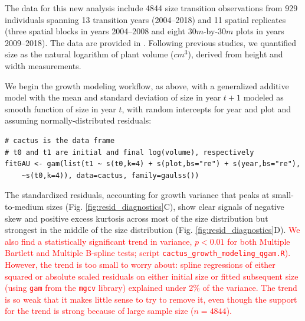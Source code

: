 \documentclass[12pt]{article}
\newcommand{\new}{\textcolor{red}}
\begin{document}
The data for this new analysis include 4844 size transition observations from 929 individuals spanning 13 transition years (2004--2018) and 11 spatial replicates (three spatial blocks in years 2004--2008 and eight $30m$-by-$30m$ plots in years 2009--2018). 
The data are provided in \cite{cactusdata}.
Following previous studies, we quantified size as the natural logarithm of plant volume ($cm^3$), derived from height and width measurements. 

We begin the growth modeling workflow, as above, with a generalized additive model with the mean and standard deviation of size in year $t+1$ modeled as smooth function of size in year $t$, with random intercepts for year and plot and assuming normally-distributed residuals:
\begin{lstlisting}
# cactus is the data frame
# t0 and t1 are initial and final log(volume), respectively
fitGAU <- gam(list(t1 ~ s(t0,k=4) + s(plot,bs="re") + s(year,bs="re"), 
	~s(t0,k=4)), data=cactus, family=gaulss())
\end{lstlisting}
The standardized residuals, accounting for growth variance that peaks at small-to-medium sizes (Fig. \ref{fig:resid_diagnostics}C), show clear signals of negative skew and positive excess kurtosis across most of the size distribution but strongest in the middle of the size distribution (Fig. \ref{fig:resid_diagnostics}D). \new{We also find a statistically significant 
trend in variance, $p<0.01$ for both Multiple Bartlett and Multiple B-spline tests; script \texttt{cactus\_growth\_modeling\_qgam.R}). However, the trend is too small to 
worry about: spline regressions of either squared or absolute scaled residuals on either initial size or fitted subsequent size (using \texttt{gam} from the \texttt{mgcv} library)
explained under 2\% of the variance. The trend is so weak that it makes little sense to try to remove it, even though the support for the trend is strong because of 
large sample size ($n=4844$). } 
\end{document}
